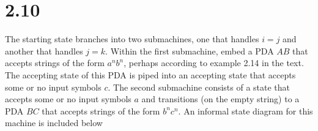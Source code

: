 \documentclass{article}
\begin{document}
\section*{2.10}
The starting state branches into two submachines, one that handles $i=j$ and another that handles $j=k$. Within the first submachine, embed a PDA $AB$ that accepts strings of the form $a^nb^n$, perhaps according to example 2.14 in the text. The accepting state of this PDA is piped into an accepting state that accepts some or no input symbols $c$. The second submachine consists of a state that accepts some or no input symbols $a$ and transitions (on the empty string) to a PDA $BC$ that accepts strings of the form $b^nc^n$. An informal state diagram for this machine is included below

\end{document}
